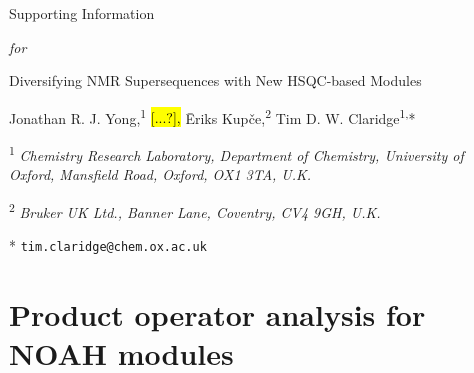 \newcommand{\sectionbreak}{\clearpage}
\renewcommand*{\thefigure}{S\arabic{figure}}
\renewcommand*{\thetable}{S\arabic{table}}
\renewcommand*{\thepage}{S\arabic{page}}
\setcounter{page}{1}
\setcounter{figure}{0}
\setcounter{table}{0}
\onehalfspacing
\hspace{0pt}
\vfill
\begin{center}
    \huge
    Supporting Information

    \textit{for}

    Diversifying NMR Supersequences with New HSQC-based Modules

    \vspace{1cm}

    \Large Jonathan R. J. Yong,\textsuperscript{1} \hl{[...?],} {\=E}riks Kup{\v{c}}e,\textsuperscript{2} Tim D. W. Claridge\textsuperscript{1,}*

    \vspace{1cm}

    \large \textsuperscript{1} \textit{Chemistry Research Laboratory, Department of Chemistry, University of Oxford, Mansfield Road, Oxford, OX1 3TA, U.K.}

    \textsuperscript{2} \textit{Bruker UK Ltd., Banner Lane, Coventry, CV4 9GH, U.K.}

    * \texttt{tim.claridge@chem.ox.ac.uk}
\end{center}
\thispagestyle{empty}
\vfill
\hspace{0pt}
\newpage

\tableofcontents

\newpage

\section{Product operator analysis for NOAH modules}

